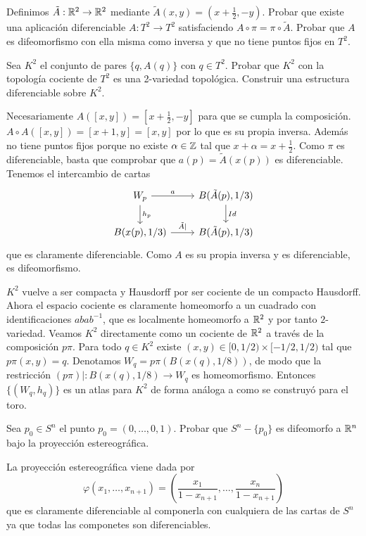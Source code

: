\documentclass[twoside]{article}
\begin{document}
\begin{ejercicio}{8.5}
Definimos $\tilde{A}:\mathbb{R}^2\to\mathbb{R}^2$ mediante $\tilde{A}(x,y)=(x+\frac{1}{2}, -y)$. Probar que existe una aplicación diferenciable $A:T^2\to T^2$ satisfaciendo $A\circ\pi =\pi\circ \tilde{A}$. Probar que $A$ es difeomorfismo con ella misma como inversa y que no tiene puntos fijos en $T^2$. 

Sea $K^2$ el conjunto de pares $\{q,A(q)\}$ con $q\in T^2$. Probar que $K^2$ con la topología cociente de $T^2$ es una 2-variedad topológica. Construir una estructura diferenciable sobre $K^2$.
\end{ejercicio}
\begin{solucion}
Necesariamente $A([x,y])=[x+\frac{1}{2}, -y]$ para que se cumpla la composición. $A\circ A([x,y])=[x+1,y]=[x,y]$ por lo que es su propia inversa. Además no tiene puntos fijos porque no existe $\alpha\in\mathbb{Z}$ tal que $x+\alpha=x+\frac{1}{2}$. Como $\pi$ es diferenciable, basta que comprobar que $a(p)=\tilde{A}(x(p))$ es diferenciable. Tenemos el intercambio de cartas
\[
\begin{tikzcd}
W_p\arrow[r, "a"]\arrow[d, "h_p"] & B(\tilde{A}(p),1/3)\arrow[d, "Id"]\\
B(x(p),1/3)\arrow[r, "\tilde{A}|"] & B(\tilde{A}(p), 1/3)
\end{tikzcd}
\]
que es claramente diferenciable. Como $A$ es su propia inversa y es diferenciable, es difeomorfismo.

$K^2$ vuelve a ser compacta y Hausdorff por ser cociente de un compacto Hausdorff. Ahora el espacio cociente es claramente homeomorfo a un cuadrado con identificaciones $abab^{-1}$, que es localmente homeomorfo a $\mathbb{R}^2$ y por tanto $2$-variedad. Veamos $K^2$ directamente como un cociente de $\mathbb{R}^2$ a través de la composición $p\pi$. Para todo $q\in K^2$ existe $(x,y)\in [0,1/2)\times [-1/2,1/2)$ tal que $p\pi(x,y)=q$. Denotamos $W_q=p\pi(B(x(q), 1/8))$, de modo que la restricción $(p\pi)|:B(x(q),1/8)\to W_q$ es homeomorfismo. Entonces $\{(W_q, h_q)\}$ es un atlas para $K^2$ de forma análoga a como se construyó para el toro.
\end{solucion}

\newpage

\begin{ejercicio}{8.6}
Sea $p_0\in S^n$  el punto $p_0=(0,\dots, 0,1)$. Probar que $S^n-\{p_0\}$ es difeomorfo a $\mathbb{R}^n$ bajo la proyección estereográfica. 
\end{ejercicio}
\begin{solucion}
\end{solucion}
La proyección estereográfica viene dada por
 \[
 φ (x_1,\dots,x_{n+1}) = \left(\frac{x_1}{1-x_{n+1}},\dots,\frac{x_n}{1-x_{n+1}}\right)
 \]
 que es claramente diferenciable al componerla con cualquiera de las cartas de $S^n$ ya que todas las componetes son diferenciables. 
\end{document}
